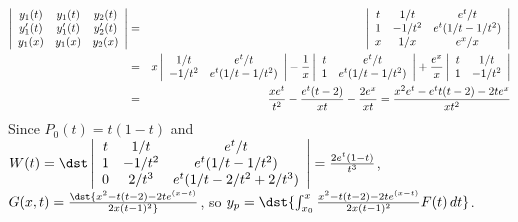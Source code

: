 \documentclass[dvips]{book}
\renewcommand{\exer}[1]{\par\medskip\;\noindent{\color{red}\bf #1.}}
\numberwithin{example}{section}
\numberwithin{equation}{section}
\numberwithin{theorem}{section}
\numberwithin{table}{section}
\numberwithin{figure}{section}
\begin{document}
\exer{9.4.38}
\begin{eqnarray*}
\left|\begin{array}{ccc}
y_1(t)&y_1(t)&y_2(t)\\
y_1'(t)&y_1'(t)&y_2'(t)\\
y_1(x)&y_1(x)&y_2(x)
\end{array}\right|&=&
\left|\begin{array}{ccc}
t&1/t&e^t/t\\
1&-1/t^2&e^t(1/t-1/t^2)\\
x&1/x&e^x/x\\
\end{array}\right|\\
&=&x\left|\begin{array}{ccc}1/t&e^t/t\\
-1/t^2&e^t(1/t-1/t^2)\end{array}\right|
-{1\over x}\left|\begin{array}{ccc}t&e^t/t\\
1&e^t(1/t-1/t^2)\end{array}\right|
+{e^x\over x}\left|\begin{array}{ccc}t&1/t\\
1&-1/t^2\end{array}\right|\\
&=&{xe^t\over t^2}-{e^t(t-2)\over xt}-{2e^x\over xt}
={x^2e^t-e^tt(t-2)-2te^x\over xt^2}
\end{eqnarray*}
Since $P_0(t)=t(1-t)$ and
$W(t)=\dst\left|\begin{array}{ccc}
t&1/t&e^t/t\\
1&-1/t^2&e^t(1/t-1/t^2)\\
0&2/t^3&e^t(1/t-2/t^2+2/t^3)
\end{array}\right|={2e^t(1-t)\over t^3}$,
$G(x,t)=\dst{x^2-t(t-2)-2te^{(x-t)}\over 2x(t-1)^2}$, so
$y_p=\dst{\int_{x_0}^x {x^2-t(t-2)-2te^{(x-t)}\over 2x(t-1)^2}
F(t)\,dt}$.
\end{document}
